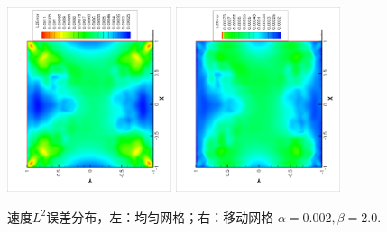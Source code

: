           \begin{figure}[ht]
            \begin{center}
              \includegraphics[width = 0.43\textwidth, angle = -90]{picture/first/collidingFlow/uniform20_error.eps}
              \includegraphics[width = 0.43\textwidth, angle = -90]{picture/first/collidingFlow/moving20_error.eps}
              \caption{\small 速度$L^2$误差分布，左：均匀网格；右：移动网格 $\alpha = 0.002, \beta = 2.0$.}
              \label{fig::uniform_vs_moving_err}
            \end{center}
          \end{figure}



